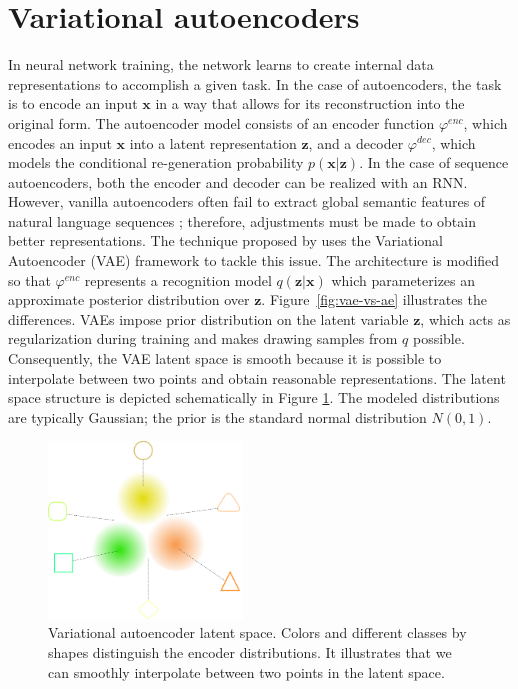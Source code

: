\section{Variational autoencoders}
\label{02:sec:vae}
In neural network training, the network learns to create internal data representations to accomplish a given task.
In the case of autoencoders, the task is to encode an input $\mathbf{x}$ in a way that allows for its reconstruction into the original form.
The autoencoder model consists of an encoder function $\varphi^{enc}$, which encodes an input $\mathbf{x}$ into a latent representation $\mathbf{z}$, and a decoder $\varphi^{dec}$, which models the conditional re-generation probability $p(\mathbf{x}|\mathbf{z})$.
In the case of sequence autoencoders, both the encoder and decoder can be realized with an RNN.
However, vanilla autoencoders often fail to extract global semantic features of natural language sequences \cite{bowman2015generating}; therefore, adjustments must be made to obtain better representations.
The technique proposed by \citet{kingma2013auto} uses the Variational Autoencoder (VAE) framework to tackle this issue.
The architecture is modified so that $\varphi^{enc}$ represents a recognition model $q(\mathbf{z}|\mathbf{x})$ which parameterizes an approximate posterior distribution over $\mathbf{z}$.
Figure~\ref{fig:vae-vs-ae} illustrates the differences.
VAEs impose prior distribution on the latent variable $\mathbf{z}$, which acts as regularization during training and makes drawing samples from $q$ possible.
Consequently, the VAE latent space is smooth because it is possible to interpolate between two points and obtain reasonable representations.
The latent space structure is depicted schematically in Figure \ref{fig:vae}.
The modeled distributions are typically Gaussian; the prior is the standard normal distribution $N(0, 1)$.
\begin{figure}[t]
    \centering
    \includegraphics[width=0.46\textwidth]{images/VAE.png}
    \caption{Variational autoencoder latent space. Colors and different classes by shapes distinguish the encoder distributions. It illustrates that we can smoothly interpolate between two points in the latent space.}
    \label{fig:vae}
\end{figure}

